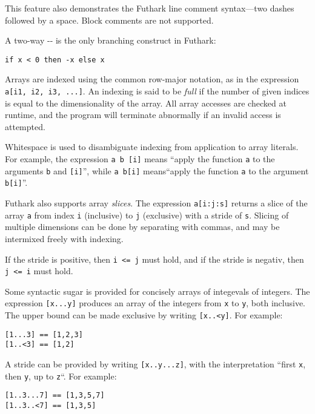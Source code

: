 \documentclass[oneside,11pt]{book}
\begin{document}
\noindent
This feature also demonstrates the Futhark line comment syntax---two dashes
followed by a space.  Block comments are not supported.

A two-way -- is the only branching construct in
Futhark:

\begin{lstlisting}
if x < 0 then -x else x
\end{lstlisting}

Arrays are indexed using the common row-major notation, as in the expression
\texttt{a[i1, i2, i3, ...]}.  An indexing is said to be \textit{full} if
the number of given indices is equal to the dimensionality of the
array.  All array accesses are checked at runtime, and the program
will terminate abnormally if an invalid access is attempted.

Whitespace is used to disambiguate indexing from application to array
literals.  For example, the expression \texttt{a~b~[i]} means ``apply
the function \texttt{a} to the arguments \texttt{b} and
\texttt{[i]}'', while \texttt{a~b[i]} means``apply the function
\texttt{a} to the argument \texttt{b[i]}''.

Futhark also supports array \textit{slices}.  The expression
\texttt{a[i:j:s]} returns a slice of the array \texttt{a} from index
\texttt{i} (inclusive) to \texttt{j} (exclusive) with a stride of
\texttt{s}.  Slicing of multiple dimensions can be done by separating
with commas, and may be intermixed freely with indexing.

If the stride is positive, then \texttt{i <= j} must hold, and if the
stride is negativ, then \texttt{j <= i} must hold.

Some syntactic sugar is provided for concisely arrays of integevals of
integers.  The expression \texttt{[x...y]} produces an array of the
integers from \texttt{x} to \texttt{y}, both inclusive.  The upper
bound can be made exclusive by writing \texttt{[x..<y]}.  For example:

\begin{lstlisting}
[1...3] == [1,2,3]
[1..<3] == [1,2]
\end{lstlisting}

A stride can be provided by writing \texttt{[x..y...z]}, with the
interpretation ``first \texttt{x}, then \texttt{y}, up to
\texttt{z}``.  For example:

\begin{lstlisting}
[1..3...7] == [1,3,5,7]
[1..3..<7] == [1,3,5]
\end{lstlisting}
\end{document}
